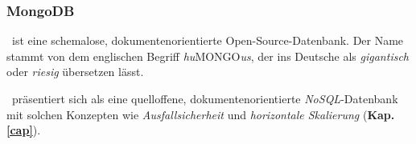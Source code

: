 
\subsubsection{MongoDB}\label{mongo}

\mongo\ ist eine  schemalose, dokumentenorientierte Open-Source-Datenbank. Der Name stammt von dem englischen Begriff \textit{hu}MONGO\textit{us}, der ins Deutsche als \textit{gigantisch} oder \textit{riesig} übersetzen lässt.


%

\mongo\ präsentiert sich als eine quelloffene, dokumentenorientierte \textit{NoSQL}-Datenbank mit solchen Konzepten wie \textit{Ausfallsicherheit} und \textit{horizontale Skalierung} (\textbf{Kap. \ref{cap}}).

